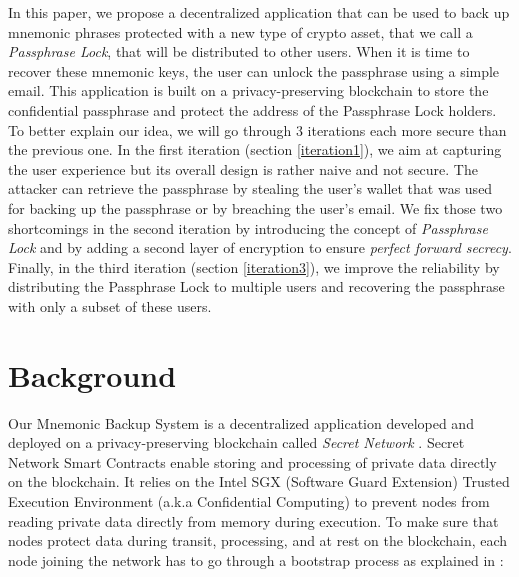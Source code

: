\documentclass[runningheads]{llncs}
\begin{document}
In this paper, we propose a decentralized application that can be used to back up mnemonic phrases protected with a new type of crypto asset, that we call a {\em Passphrase Lock}, that will be distributed to other users. When it is time to recover these mnemonic keys, the user can unlock the passphrase using a simple email. This application is built on a privacy-preserving blockchain \cite{zyskind2015decentralizing} to store the confidential passphrase and protect the address of the Passphrase Lock holders. To better explain our idea, we will go through 3 iterations each more secure than the previous one. In the first iteration (section \ref{iteration1}), we aim at capturing the user experience but its overall design is rather naive and not secure. The attacker can retrieve the passphrase by stealing the user's wallet that was used for backing up the passphrase or by breaching the user's email. We fix those two shortcomings in the second iteration by introducing the concept of {\em Passphrase Lock} and by adding a second layer of encryption to ensure {\em perfect forward secrecy}. Finally, in the third iteration (section \ref{iteration3}), we improve the reliability by distributing the Passphrase Lock to multiple users and recovering the passphrase with only a subset of these users. 

\section{Background}

Our Mnemonic Backup System is a decentralized application developed and deployed on a privacy-preserving blockchain called {\em Secret Network} \cite{zyskind2015decentralizing}. Secret Network Smart Contracts enable storing and processing of private data directly on the blockchain. It relies on the Intel SGX (Software Guard Extension) Trusted Execution Environment (a.k.a Confidential Computing) \cite{mckeen2013innovative} to prevent nodes from reading private data directly from memory during execution. To make sure that nodes protect data during transit, processing, and at rest on the blockchain, each node joining the network has to go through a bootstrap process as explained in \cite{secretnetwork}:
\end{document}
